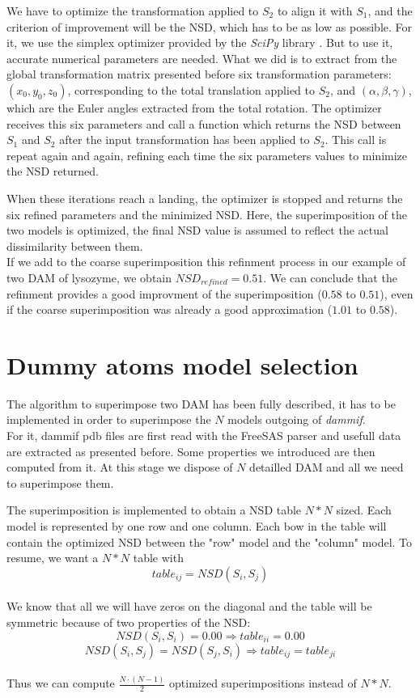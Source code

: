 \documentclass[a4paper, 11pt]{report}
\begin{document}
We have to optimize the transformation applied to $S_{2}$ to align it 
with $S_{1}$, and the criterion of improvement will be the NSD, which 
has to be as low as possible. 
For it, we use the simplex optimizer provided by the \textit{SciPy} 
library \cite{scipy}. 
But to use it, accurate numerical parameters are needed. 
What we did is to extract from the global transformation matrix 
presented before six transformation parameters: 
$(x_{0}, y_{0}, z_{0})$, 
corresponding to the total translation applied to $S_{2}$, and 
$(\alpha, \beta, \gamma)$, 
which are the Euler angles extracted from the total rotation. 
The optimizer receives this six parameters and call a function which 
returns the NSD between $S_{1}$ and $S_{2}$ after the input 
transformation has been applied to $S_{2}$. 
This call is repeat again and again, refining each time the six 
parameters values to minimize the NSD returned.

When these iterations reach a landing, the optimizer is stopped and 
returns the six refined parameters and the minimized NSD. 
Here, the superimposition of the two models is optimized, the final 
NSD value is assumed to reflect the actual dissimilarity between them.\\

If we add to the coarse superimposition this refinment process in our 
example of two DAM of lysozyme, we obtain $NSD_{refined} = 0.51$. 
We can conclude that the refinment provides a good improvment of the 
superimposition ($0.58$ to $0.51$), even if the coarse superimposition 
was already a good approximation ($1.01$ to $0.58$).

\section{Dummy atoms model selection}

The algorithm to superimpose two DAM has been fully described, it has 
to be implemented in order to superimpose the $N$ models outgoing of 
\textit{dammif}. \\

For it, dammif pdb files are first read with the FreeSAS parser and 
usefull data are extracted as presented before. 
Some properties we introduced are then computed from it. 
At this stage we dispose of $N$ detailled DAM and all we need to 
superimpose them.

The superimposition is implemented to obtain a NSD table $N*N$ sized. 
Each model is represented by one row and one column. 
Each bow in the table will contain the optimized NSD between the "row" 
model and the "column" model. 
To resume, we want a $N*N$ table with 
\[
table_{ij}=NSD(S_{i},S_{j})
\]\\ 
We know that all we will have zeros on the diagonal and the table will 
be symmetric because of two properties of the NSD:
\[
NSD(S_{i},S_{i})=0.00 \Rightarrow table_{ii}=0.00
\]
\[
NSD(S_{i},S_{j}) = NSD(S_{j},S_{i}) \Rightarrow table_{ij}=table_{ji}
\]\\
Thus we can compute $\frac{N \cdot (N-1)}{2}$ optimized 
superimpositions instead of $N*N$.\\
\end{document}
